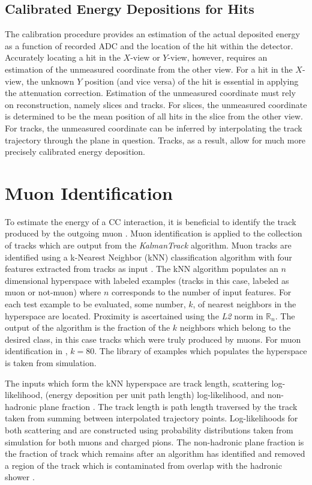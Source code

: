 \subsection{Calibrated Energy Depositions for Hits}
\label{calib_atten_section}

The calibration procedure provides an estimation of the actual deposited
energy as a function of recorded ADC and the location of the hit within
the detector.
Accurately locating a hit in the $X$-view or $Y$-view, however, requires
an estimation of the unmeasured coordinate from the other view.
For a hit in the $X$-view, the unknown $Y$ position (and vice versa) of the hit
is essential in applying the attenuation correction.
Estimation of the unmeasured coordinate must rely on reconstruction,
namely slices and tracks.
For slices, the unmeasured coordinate is determined to be the mean position
of all hits in the slice from the other view.
For tracks, the unmeasured coordinate can be inferred by interpolating the
track trajectory through the plane in question.
Tracks, as a result, allow for much more precisely calibrated energy deposition.

\section{Muon Identification}
\label{remid_section}
To estimate the energy of a \numu CC interaction, it is beneficial to identify
the track produced by the outgoing muon \cite{lein2015thesis}.
Muon identification is applied to the collection of tracks which are output
from the \textit{KalmanTrack} algorithm.
Muon tracks are identified using a k-Nearest Neighbor (kNN)
\cite{altman1992introduction} classification
algorithm with four features extracted from tracks as input
\cite{raddatz2016thesis}.
The kNN algorithm populates an $n$ dimensional hyperspace with labeled
examples (tracks in this case, labeled as muon or not-muon) where $n$
corresponds to the number of input features.
For each test example to be evaluated, some number, $k$, of nearest neighbors
in the hyperspace
are located.  Proximity is ascertained using the \textit{L2} norm in
$\mathbb{R}_n$.
The output of the algorithm is the fraction of the $k$ neighbors which belong
to the desired class, in this case tracks which were truly produced by muons.
For muon identification in \nova, $k = 80$.
The library of examples which populates the hyperspace is taken from
\nova simulation.

The inputs which form the kNN hyperspace are track length, scattering
log-likelihood, \dedx (energy deposition per unit
path length) log-likelihood, and non-hadronic plane fraction
\cite{raddatz2016thesis}.
The track length is path length traversed by the track taken from
summing between interpolated trajectory points.
Log-likelihoods for both scattering and \dedx are constructed using
probability distributions taken from simulation for both muons and
charged pions.
The non-hadronic plane fraction is the fraction of track which remains
after an algorithm has identified and removed a region of the track
which is contaminated from overlap with the hadronic shower
\cite{sachdev2015thesis}.

